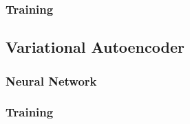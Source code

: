 \subsubsection{Training}




\subsection{Variational Autoencoder}
\subsubsection{Neural Network}
\subsubsection{Training}







